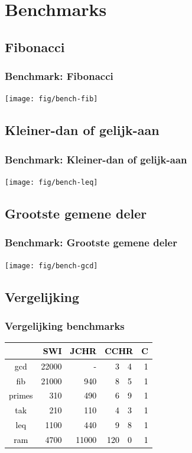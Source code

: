 \documentclass{beamer}
\newcommand{\cFront}[1]{\textcolor{black}{#1}}
\begin{document}
\section{Benchmarks}

\subsection{Fibonacci}

\begin{frame}
  \frametitle{Benchmark: Fibonacci}
  \texttt{[image: fig/bench-fib]}
\end{frame}

\subsection{Kleiner-dan of gelijk-aan}

\begin{frame}
  \frametitle{Benchmark: Kleiner-dan of gelijk-aan}
  \texttt{[image: fig/bench-leq]}
\end{frame}

\subsection{Grootste gemene deler}

\begin{frame}
  \frametitle{Benchmark: Grootste gemene deler}
  \texttt{[image: fig/bench-gcd]}
\end{frame}

\subsection{Vergelijking}

\begin{frame}
\frametitle{Vergelijking benchmarks}
\begin{center}
\cFront{\begin{tabular}{|c|rrr@{.}lr|}
\hline
 & {\bf SWI} & {\bf JCHR} & \multicolumn{2}{c}{\bf CCHR} & {\bf C} \\
\hline
gcd    & 22000 & -     &   3&4  & 1 \\
fib    & 21000 & 940   &   8&5  & 1 \\
primes & 310   & 490   &   6&9  & 1 \\
tak    & 210   & 110   &   4&3  & 1 \\
leq    & 1100  & 440   &   9&8  & 1 \\
ram    & 4700  & 11000 &  120&0 & 1 \\
\hline
\end{tabular}}
\end{center}
\end{frame}
\end{document}
